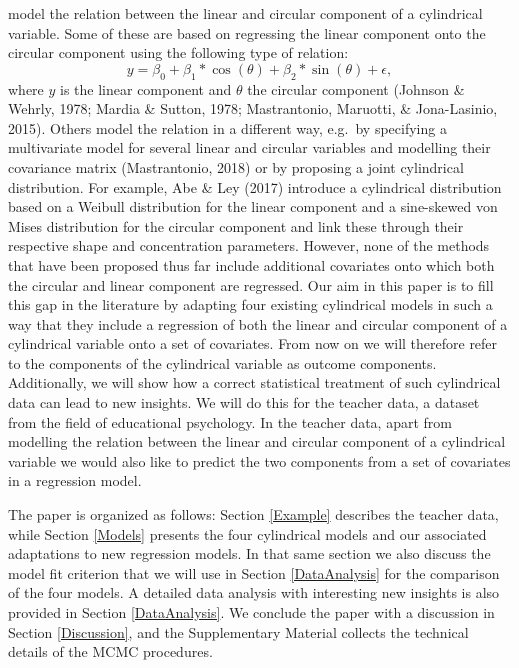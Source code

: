 \documentclass[12pt,]{article}
\begin{document}
model the relation between the linear and circular component of a
cylindrical variable. Some of these are based on regressing the linear
component onto the circular component using the following type of
relation: \[y = \beta_0 +
\beta_1*\cos(\theta) + \beta_2*\sin(\theta)+ \epsilon,\] where \(y\) is
the linear component and \(\theta\) the circular component (Johnson \&
Wehrly, 1978; Mardia \& Sutton, 1978; Mastrantonio, Maruotti, \&
Jona-Lasinio, 2015). Others model the relation in a different way,
e.g.~by specifying a multivariate model for several linear and circular
variables and modelling their covariance matrix (Mastrantonio, 2018) or
by proposing a joint cylindrical distribution. For example, Abe \& Ley
(2017) introduce a cylindrical distribution based on a Weibull
distribution for the linear component and a sine-skewed von Mises
distribution for the circular component and link these through their
respective shape and concentration parameters. However, none of the
methods that have been proposed thus far include additional covariates
onto which both the circular and linear component are regressed.\newline
\indent Our aim in this paper is to fill this gap in the literature by
adapting four existing cylindrical models in such a way that they
include a regression of both the linear and circular component of a
cylindrical variable onto a set of covariates. From now on we will
therefore refer to the components of the cylindrical variable as outcome
components. Additionally, we will show how a correct statistical
treatment of such cylindrical data can lead to new insights. We will do
this for the teacher data, a dataset from the field of educational
psychology. In the teacher data, apart from modelling the relation
between the linear and circular component of a cylindrical variable we
would also like to predict the two components from a set of covariates
in a regression model.

The paper is organized as follows: Section \ref{Example} describes the
teacher data, while Section \ref{Models} presents the four cylindrical
models and our associated adaptations to new regression models. In that
same section we also discuss the model fit criterion that we will use in
Section \ref{DataAnalysis} for the comparison of the four models. A
detailed data analysis with interesting new insights is also provided in
Section \ref{DataAnalysis}. We conclude the paper with a discussion in
Section \ref{Discussion}, and the Supplementary Material collects the
technical details of the MCMC procedures.
\end{document}
